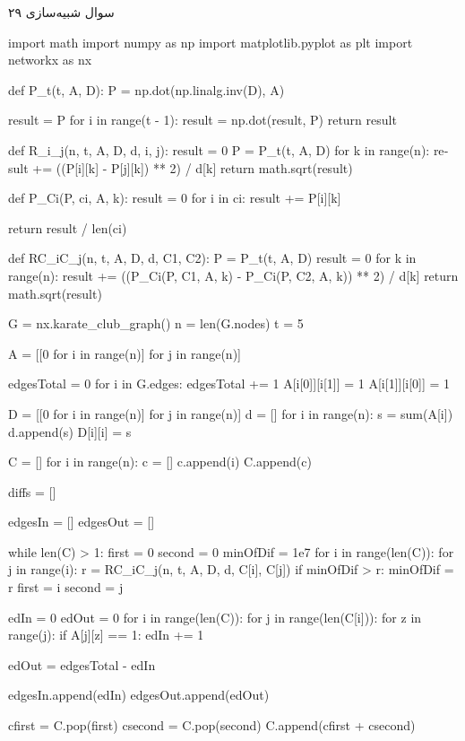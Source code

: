 سوال شبیه‌سازی ۲۹

\begin{latin}
\begin{python}
import math
import numpy as np
import matplotlib.pyplot as plt
import networkx as nx


def P_t(t, A, D):
    P = np.dot(np.linalg.inv(D), A)

    result = P
    for i in range(t - 1):
        result = np.dot(result, P)
    return result


def R_i_j(n, t, A, D, d, i, j):
    result = 0
    P = P_t(t, A, D)
    for k in range(n):
        result += ((P[i][k] - P[j][k]) ** 2) / d[k]
    return math.sqrt(result)


def P_Ci(P, ci, A, k):
    result = 0
    for i in ci:
        result += P[i][k]

    return result / len(ci)


def RC_iC_j(n, t, A, D, d, C1, C2):
    P = P_t(t, A, D)
    result = 0
    for k in range(n):
        result += ((P_Ci(P, C1, A, k) - P_Ci(P, C2, A, k)) ** 2) / d[k]
    return math.sqrt(result)


G = nx.karate_club_graph()
n = len(G.nodes)
t = 5

A = [[0 for i in range(n)] for j in range(n)]

edgesTotal = 0
for i in G.edges:
    edgesTotal += 1
    A[i[0]][i[1]] = 1
    A[i[1]][i[0]] = 1

D = [[0 for i in range(n)] for j in range(n)]
d = []
for i in range(n):
    s = sum(A[i])
    d.append(s)
    D[i][i] = s

C = []
for i in range(n):
    c = []
    c.append(i)
    C.append(c)

diffs = []

edgesIn = []
edgesOut = []

while len(C) > 1:
    first = 0
    second = 0
    minOfDif = 1e7
    for i in range(len(C)):
        for j in range(i):
            r = RC_iC_j(n, t, A, D, d, C[i], C[j])
            if minOfDif > r:
                minOfDif = r
                first = i
                second = j

    edIn = 0
    edOut = 0
    for i in range(len(C)):
        for j in range(len(C[i])):
            for z in range(j):
                if A[j][z] == 1:
                    edIn += 1

    edOut = edgesTotal - edIn

    edgesIn.append(edIn)
    edgesOut.append(edOut)

    cfirst = C.pop(first)
    csecond = C.pop(second)
    C.append(cfirst + csecond)


\end{python}
\end{latin}

